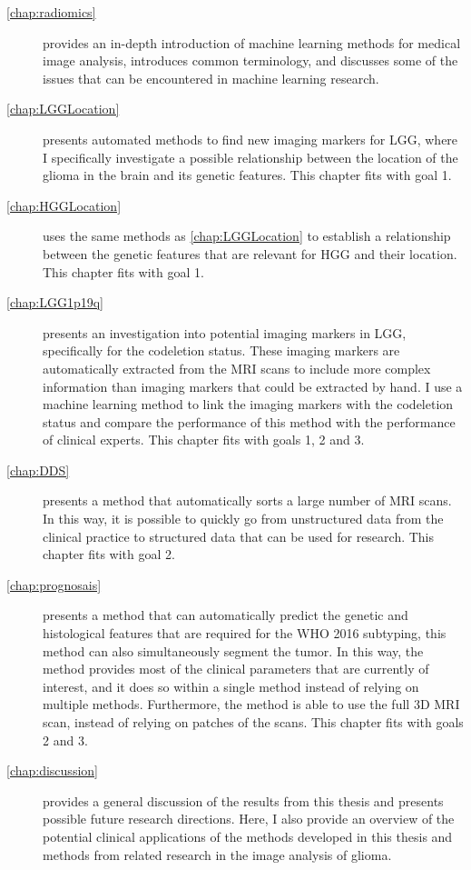 \begin{description}
    \item[\cref{chap:radiomics}] provides an in-depth introduction of machine learning methods for medical image analysis, introduces common terminology, and discusses some of the issues that can be encountered in machine learning research.

    \item[\cref{chap:LGGLocation}] presents automated methods to find new imaging markers for \gls{LGG}, where I specifically investigate a possible relationship between the location of the \gls{glioma} in the brain and its genetic features.
    This chapter fits with goal 1.

    \item[\cref{chap:HGGLocation}] uses the same methods as \cref{chap:LGGLocation} to establish a relationship between the genetic features that are relevant for \gls{HGG} and their location.
    This chapter fits with goal 1.

    \item[\cref{chap:LGG1p19q}] presents an investigation into potential imaging markers in \gls{LGG}, specifically for the \gls{codeletion} status.
    These imaging markers are automatically extracted from the \gls{MRI} scans to include more complex information than imaging markers that could be extracted by hand.
    I use a machine learning method to link the imaging markers with the \gls{codeletion} status and compare the performance of this method with the performance of clinical experts.
    This chapter fits with goals 1, 2 and 3.

    \item[\cref{chap:DDS}] presents a method that automatically sorts a large number of \gls{MRI} scans.
    In this way, it is possible to quickly go from unstructured data from the clinical practice to structured data that can be used for research.
    This chapter fits with goal 2.

    \item[\cref{chap:prognosais}] presents a method that can automatically predict the genetic and histological features that are required for the \gls{WHO} 2016 subtyping, this method can also simultaneously segment the \gls{tumor}.
    In this way, the method provides most of the clinical parameters that are currently of interest, and it does so within a single method instead of relying on multiple methods.
    Furthermore, the method is able to use the full 3D \gls{MRI} scan, instead of relying on patches of the scans.
    This chapter fits with goals 2 and 3.


    \item[\cref{chap:discussion}] provides a general discussion of the results from this thesis and presents possible future research directions.
    Here, I also provide an overview of the potential clinical applications of the methods developed in this thesis and methods from related research in the image analysis of glioma.

\end{description}


